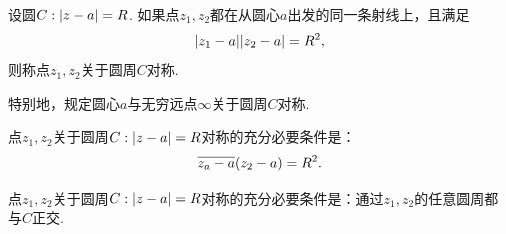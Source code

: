 \begin{definition}
设圆\(C: \abs{z - a} = R\).
如果点\(z_1,z_2\)都在从圆心\(a\)出发的同一条射线上，且满足\begin{equation*}
\abs{z_1 - a} \abs{z_2 - a} = R^2,
\end{equation*}则称点\(z_1,z_2\)关于圆周\(C\)对称.

特别地，规定圆心\(a\)与无穷远点\(\infty\)关于圆周\(C\)对称.
\end{definition}

\begin{theorem}
点\(z_1,z_2\)关于圆周\(C: \abs{z - a} = R\)对称的充分必要条件是：\begin{equation*}
\overline{z_a - a} (z_2 - a) = R^2.
\end{equation*}
\end{theorem}

\begin{theorem}
点\(z_1,z_2\)关于圆周\(C: \abs{z - a} = R\)对称的充分必要条件是：通过\(z_1,z_2\)的任意圆周都与\(C\)正交.
\end{theorem}
